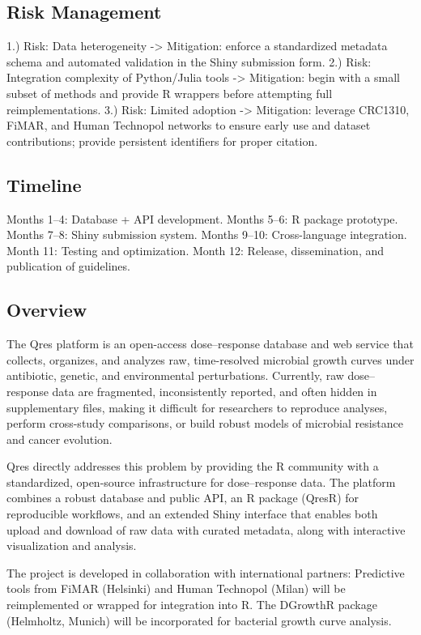 \documentclass[
]{article}
\begin{document}
\subsection{Risk Management}\label{risk-management}

1.) Risk: Data heterogeneity -\textgreater{} Mitigation: enforce a
standardized metadata schema and automated validation in the Shiny
submission form. 2.) Risk: Integration complexity of Python/Julia tools
-\textgreater{} Mitigation: begin with a small subset of methods and
provide R wrappers before attempting full reimplementations. 3.) Risk:
Limited adoption -\textgreater{} Mitigation: leverage CRC1310, FiMAR,
and Human Technopol networks to ensure early use and dataset
contributions; provide persistent identifiers for proper citation.

\subsection{Timeline}\label{timeline}

Months 1--4: Database + API development. Months 5--6: R package
prototype. Months 7--8: Shiny submission system. Months 9--10:
Cross-language integration. Month 11: Testing and optimization. Month
12: Release, dissemination, and publication of guidelines.

\subsection{Overview}\label{overview}

The Qres platform is an open-access dose--response database and web
service that collects, organizes, and analyzes raw, time-resolved
microbial growth curves under antibiotic, genetic, and environmental
perturbations. Currently, raw dose--response data are fragmented,
inconsistently reported, and often hidden in supplementary files, making
it difficult for researchers to reproduce analyses, perform cross-study
comparisons, or build robust models of microbial resistance and cancer
evolution.

Qres directly addresses this problem by providing the R community with a
standardized, open-source infrastructure for dose--response data. The
platform combines a robust database and public API, an R package (QresR)
for reproducible workflows, and an extended Shiny interface that enables
both upload and download of raw data with curated metadata, along with
interactive visualization and analysis.

The project is developed in collaboration with international partners:
Predictive tools from FiMAR (Helsinki) and Human Technopol (Milan) will
be reimplemented or wrapped for integration into R. The DGrowthR package
(Helmholtz, Munich) will be incorporated for bacterial growth curve
analysis.
\end{document}
